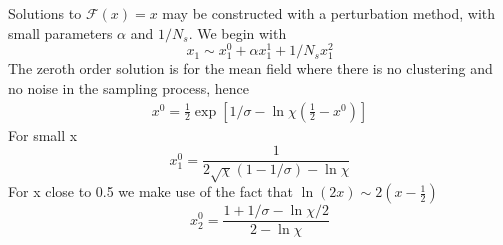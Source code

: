 \documentclass[aps,prl,twocolumn,showpacs,superscriptaddress,groupedaddress]{revtex4}
\begin{document}
Solutions to $\mathcal{F}(x)=x$ may be constructed with a perturbation method, with small parameters $\alpha$ and $1/N_s$. We begin with 
\begin{equation}
x_1 \sim x^0_1 + \alpha x^1_1 + 1/N_s x^2_1
\end{equation}
The zeroth order solution is for the mean field where there is no clustering and no noise in the sampling process, hence
\begin{align}
x^0  = \frac{1}{2}\exp{\left[ 1/\sigma -  \ln\chi  \left(\frac{1}{2}-x^0\right)\right]} 
\end{align}
For small x
\begin{equation}
x^0_1 = \frac{1}{2\sqrt{\chi}(1-1/\sigma) -  \ln\chi}
\end{equation}
For x close to 0.5 we make use of the fact that $\ln(2x) \sim 2(x-\frac{1}{2})$
\begin{equation}
x^0_2 = \frac{1+1/\sigma - \ln\chi/2 }{2 -  \ln\chi}
\end{equation}


%
%
%

\end{document}
